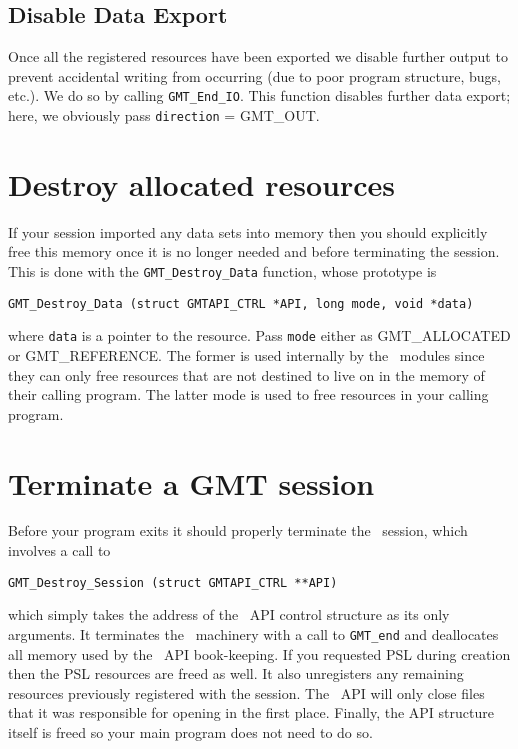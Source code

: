 \documentclass{report}
\begin{document}
\subsection{Disable Data Export}

Once all the registered resources have been exported we disable further output to prevent accidental
writing from occurring (due to poor program structure, bugs, etc.).  We do so by calling \texttt{GMT\_End\_IO}.  This
function disables further data export; here, we obviously pass \texttt{direction} = GMT\_OUT.

\section{Destroy allocated resources}

If your session imported any data sets into memory then you should explicitly free this
memory once it is no longer needed and before terminating the session.
This is done with the \texttt{GMT\_Destroy\_Data} function, whose prototype is

\begin{verbatim}
GMT_Destroy_Data (struct GMTAPI_CTRL *API, long mode, void *data)
\end{verbatim}
where \texttt{data} is a pointer to the resource.
Pass \texttt{mode} either as GMT\_ALLOCATED or GMT\_REFERENCE.  The former
is used internally by the \GMT\ modules since they can only free resources that are
not destined to live on in the memory of their calling program.  The latter mode is used
to free resources in your calling program.

\section{Terminate a GMT session}

Before your program exits it should properly terminate the \GMT\ session, which involves a call to

\begin{verbatim}
GMT_Destroy_Session (struct GMTAPI_CTRL **API)
\end{verbatim}
which simply takes the address of the \GMT\ API control structure as its only arguments.  It terminates the \GMT\ machinery
with a call to \texttt{GMT\_end} and deallocates all memory used by the \GMT\ API book-keeping. If you
requested PSL during creation then the PSL resources are freed as well.  It
also unregisters any remaining resources previously registered with the session.
The \GMT\ API will only close files that it was responsible for opening in the first place.
Finally, the API structure itself is freed so your main program does not need to do so.
\end{document}
